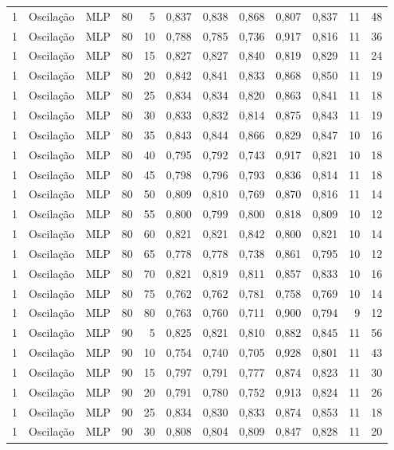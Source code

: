 \begin{longtable}{@{}rllrrrrrrrrr@{}}
1 & Oscilação & MLP & 80 & 5 & 0,837 & 0,838 & 0,868 & 0,807 & 0,837 & 11 & 48 \\
1 & Oscilação & MLP & 80 & 10 & 0,788 & 0,785 & 0,736 & 0,917 & 0,816 & 11 & 36 \\
1 & Oscilação & MLP & 80 & 15 & 0,827 & 0,827 & 0,840 & 0,819 & 0,829 & 11 & 24 \\
1 & Oscilação & MLP & 80 & 20 & 0,842 & 0,841 & 0,833 & 0,868 & 0,850 & 11 & 19 \\
1 & Oscilação & MLP & 80 & 25 & 0,834 & 0,834 & 0,820 & 0,863 & 0,841 & 11 & 18 \\
1 & Oscilação & MLP & 80 & 30 & 0,833 & 0,832 & 0,814 & 0,875 & 0,843 & 11 & 19 \\
1 & Oscilação & MLP & 80 & 35 & 0,843 & 0,844 & 0,866 & 0,829 & 0,847 & 10 & 16 \\
1 & Oscilação & MLP & 80 & 40 & 0,795 & 0,792 & 0,743 & 0,917 & 0,821 & 10 & 18 \\
1 & Oscilação & MLP & 80 & 45 & 0,798 & 0,796 & 0,793 & 0,836 & 0,814 & 11 & 18 \\
1 & Oscilação & MLP & 80 & 50 & 0,809 & 0,810 & 0,769 & 0,870 & 0,816 & 11 & 14 \\
1 & Oscilação & MLP & 80 & 55 & 0,800 & 0,799 & 0,800 & 0,818 & 0,809 & 10 & 12 \\
1 & Oscilação & MLP & 80 & 60 & 0,821 & 0,821 & 0,842 & 0,800 & 0,821 & 10 & 14 \\
1 & Oscilação & MLP & 80 & 65 & 0,778 & 0,778 & 0,738 & 0,861 & 0,795 & 10 & 12 \\
1 & Oscilação & MLP & 80 & 70 & 0,821 & 0,819 & 0,811 & 0,857 & 0,833 & 10 & 16 \\
1 & Oscilação & MLP & 80 & 75 & 0,762 & 0,762 & 0,781 & 0,758 & 0,769 & 10 & 14 \\
1 & Oscilação & MLP & 80 & 80 & 0,763 & 0,760 & 0,711 & 0,900 & 0,794 & 9 & 12 \\
1 & Oscilação & MLP & 90 & 5 & 0,825 & 0,821 & 0,810 & 0,882 & 0,845 & 11 & 56 \\
1 & Oscilação & MLP & 90 & 10 & 0,754 & 0,740 & 0,705 & 0,928 & 0,801 & 11 & 43 \\
1 & Oscilação & MLP & 90 & 15 & 0,797 & 0,791 & 0,777 & 0,874 & 0,823 & 11 & 30 \\
1 & Oscilação & MLP & 90 & 20 & 0,791 & 0,780 & 0,752 & 0,913 & 0,824 & 11 & 26 \\
1 & Oscilação & MLP & 90 & 25 & 0,834 & 0,830 & 0,833 & 0,874 & 0,853 & 11 & 18 \\
1 & Oscilação & MLP & 90 & 30 & 0,808 & 0,804 & 0,809 & 0,847 & 0,828 & 11 & 20 \\

\end{longtable}
